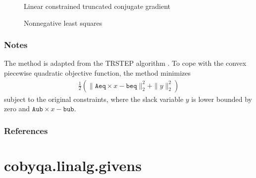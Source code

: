 \documentclass[letterpaper,10pt,english]{sphinxmanual}
\begin{document}
\begin{fulllineitems}
\begin{description}
\item[{{\hyperref[\detokenize{refs/generated/cobyqa.linalg.lctcg:cobyqa.linalg.lctcg}]{}}}] \leavevmode
\sphinxAtStartPar
Linear constrained truncated conjugate gradient

\item[{{\hyperref[\detokenize{refs/generated/cobyqa.linalg.nnls:cobyqa.linalg.nnls}]{}}}] \leavevmode
\sphinxAtStartPar
Nonnegative least squares

\end{description}


\subsubsection*{Notes}

\sphinxAtStartPar
The method is adapted from the TRSTEP algorithm . To cope with the
convex piecewise quadratic objective function, the method minimizes
\begin{equation*}
\begin{split}\frac{1}{2} ( \| \mathtt{Aeq} \times x - \mathtt{beq} \|_2^2 +
\| y \|_2^2 )\end{split}
\end{equation*}
\sphinxAtStartPar
subject to the original constraints, where the slack variable \(y\) is
lower bounded by zero and \(\mathtt{Aub} \times x - \mathtt{bub}\).
\subsubsection*{References}

\sphinxAtStartPar
{}

\end{fulllineitems}



\section{cobyqa.linalg.givens}
\label{\detokenize{refs/generated/cobyqa.linalg.givens:cobyqa-linalg-givens}}\label{\detokenize{refs/generated/cobyqa.linalg.givens::doc}}
\end{document}
